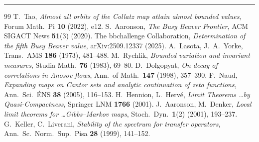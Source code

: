 \documentclass[10pt]{article}
\begin{document}
{\footnotesize
\vspace{2pt}\hrule\vspace{3pt}
\begin{thebibliography}{99}\small
\itemsep=0pt
 T.~Tao, \emph{Almost all orbits of the Collatz map attain almost bounded values}, Forum Math.\ Pi \textbf{10} (2022), e12.
 S.~Aaronson, \emph{The Busy Beaver Frontier}, ACM SIGACT News \textbf{51}(3) (2020).
 The bbchallenge Collaboration, \emph{Determination of the fifth Busy Beaver value}, arXiv:2509.12337 (2025).
 A.~Lasota, J.~A.~Yorke, Trans.\ AMS \textbf{186} (1973), 481--488.
 M.~Rychlik, \emph{Bounded variation and invariant measures}, Studia Math.\ \textbf{76} (1983), 69--80.
 D.~Dolgopyat, \emph{On decay of correlations in Anosov flows}, Ann.\ of Math.\ \textbf{147} (1998), 357--390.
 F.~Naud, \emph{Expanding maps on Cantor sets and analytic continuation of zeta functions}, Ann.\ Sci.\ \'ENS \textbf{38} (2005), 116--153.
 H.~Hennion, L.~Herv\'e, \emph{Limit Theorems \ldots by Quasi-Compactness}, Springer LNM \textbf{1766} (2001).
 J.~Aaronson, M.~Denker, \emph{Local limit theorems for \ldots Gibbs--Markov maps}, Stoch.\ Dyn.\ \textbf{1}(2) (2001), 193--237.
 G.~Keller, C.~Liverani, \emph{Stability of the spectrum for transfer operators}, Ann.\ Sc.\ Norm.\ Sup.\ Pisa \textbf{28} (1999), 141--152.
\end{thebibliography}
}
\end{document}
